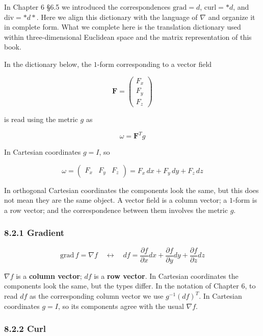 \documentclass[a4paper,12pt,openany]{book}
\begin{document}
In Chapter 6 §6.5 we introduced the correspondences \(\mathrm{grad}=d\),
\(\mathrm{curl}=\ast d\), and \(\mathrm{div}=\ast d\ast\). Here we align
this dictionary with the language of \(\nabla\) and organize it in
complete form. What we complete here is the translation dictionary used
within three-dimensional Euclidean space and the matrix representation
of this book.

In the dictionary below, the \(1\)-form corresponding to a vector field

\[
\mathbf{F}
=
\begin{pmatrix}
F_x\\
F_y\\
F_z
\end{pmatrix}
\]

is read using the metric \(g\) as

\[
\omega=\mathbf{F}^T g
\]

In Cartesian coordinates \(g=I\), so

\[
\omega
=
\begin{pmatrix}
F_x & F_y & F_z
\end{pmatrix}
=
F_x\,dx+F_y\,dy+F_z\,dz
\]

In orthogonal Cartesian coordinates the components look the same, but
this does not mean they are the same object. A vector field is a column
vector; a \(1\)-form is a row vector; and the correspondence between
them involves the metric \(g\).

\hypertarget{gradient-1}{%
\subsubsection{8.2.1 Gradient}\label{gradient-1}}

\[
\mathrm{grad}\,f = \nabla f
\quad\longleftrightarrow\quad
df = \frac{\partial f}{\partial x}dx + \frac{\partial f}{\partial y}dy + \frac{\partial f}{\partial z}dz
\]

\(\nabla f\) is a \textbf{column vector}; \(df\) is a
\textbf{row vector}. In Cartesian coordinates the components look the
same, but the types differ. In the notation of Chapter 6, to read \(df\)
as the corresponding column vector we use \(g^{-1}(df)^T\). In Cartesian
coordinates \(g=I\), so its components agree with the usual
\(\nabla f\).

\hypertarget{curl-1}{%
\subsubsection{8.2.2 Curl}\label{curl-1}}
\end{document}
